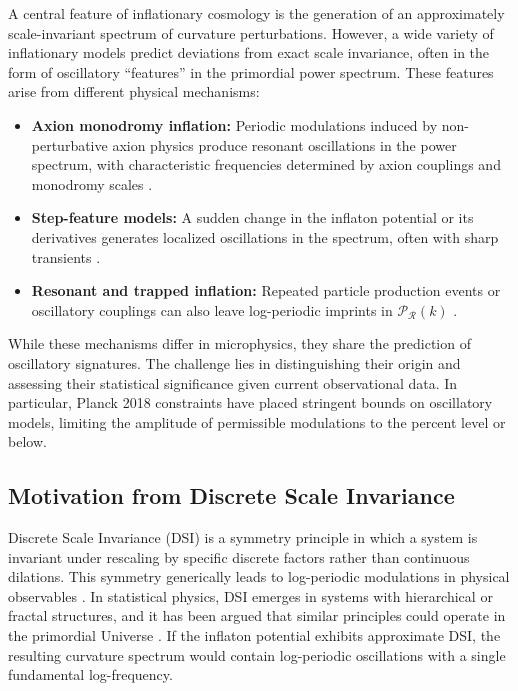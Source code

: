 \documentclass[reprint, amsmath, amssymb, aps, prd, nofootinbib]{revtex4-2}
\begin{document}
A central feature of inflationary cosmology is the generation of an approximately
scale-invariant spectrum of curvature perturbations. However, a wide variety of
inflationary models predict deviations from exact scale invariance, often in the form of
oscillatory ``features'' in the primordial power spectrum. These features arise from
different physical mechanisms:
\begin{itemize}
    \item \textbf{Axion monodromy inflation:} Periodic modulations induced by
    non-perturbative axion physics produce resonant oscillations in the power spectrum,
    with characteristic frequencies determined by axion couplings and monodromy scales
    \cite{Flauger2010}.
    \item \textbf{Step-feature models:} A sudden change in the inflaton potential or its
    derivatives generates localized oscillations in the spectrum, often with sharp
    transients \cite{Adshead2012}.
    \item \textbf{Resonant and trapped inflation:} Repeated particle production events or
    oscillatory couplings can also leave log-periodic imprints in $\mathcal{P}_\mathcal{R}(k)$
    \cite{Chen2010}.
\end{itemize}

While these mechanisms differ in microphysics, they share the prediction of oscillatory
signatures. The challenge lies in distinguishing their origin and assessing their
statistical significance given current observational data. In particular, Planck 2018
constraints have placed stringent bounds on oscillatory models, limiting the amplitude of
permissible modulations to the percent level or below.

\subsection{Motivation from Discrete Scale Invariance}

Discrete Scale Invariance (DSI) is a symmetry principle in which a system is invariant
under rescaling by specific discrete factors rather than continuous dilations. This
symmetry generically leads to log-periodic modulations in physical observables
\cite{Sornette1998}. In statistical physics, DSI emerges in systems with hierarchical or
fractal structures, and it has been argued that similar principles could operate in the
primordial Universe \cite{Calcagni2010}. If the inflaton potential exhibits approximate
DSI, the resulting curvature spectrum would contain log-periodic oscillations with a
single fundamental log-frequency.
\end{document}
